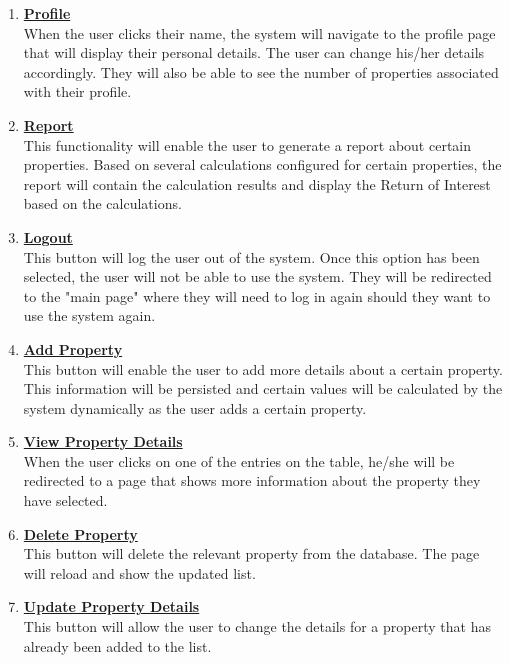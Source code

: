 \documentclass[a4paper,12pt]{article}
\begin{document}
	\begin{enumerate}
		\item{\underline{\bfseries Profile}}\\[0.2cm] 
		When the user clicks their name, the system will navigate to the profile page that will display their personal details. 				The user can change his/her details accordingly. They will also be able to see the number of properties associated 				with their profile.
		\bigskip
		\item{\underline{\bfseries Report}}\\[0.2cm] 
		This functionality will enable the user to generate a report about certain properties. Based on several calculations 				configured for certain properties, the report will contain the calculation results and display the Return of Interest based 			on the calculations. 
		\bigskip
		\item{\underline{\bfseries Logout}}\\[0.2cm] 
		This button will log the user out of the system. Once this option has been selected, the user will not be able to use the 				system. They will be redirected to the "main page" where they will need to log in again should they want to use the system 				again. 
		\bigskip
		\item{\underline{\bfseries Add Property}}\\[0.2cm] 
		This button will enable the user to add more details about a certain property. This information will be persisted and 				certain values will be calculated by the system dynamically as the user adds a certain property.
		\bigskip
		\item{\underline{\bfseries View Property Details}}\\[0.2cm] 
		When the user clicks on one of the entries on the table, he/she will be redirected to a page that shows more information 		about the property they have selected.
		\bigskip
		\item{\underline{\bfseries Delete Property}}\\[0.2cm] 
		This button will delete the relevant property from the database. The page will reload and show the updated list.
		\bigskip
		\item{\underline{\bfseries Update Property Details}}\\[0.2cm] 
		This button will allow the user to change the details for a property that has already been added to the list.
	\end{enumerate}

\end{document}
